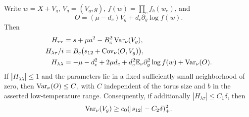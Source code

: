 \begin{lemma}\label{xyf:hessian}
Write \(w=X+V_q\), \(V_g=(V_q,g)\), \(f(w)=\prod_e f_b(w_e)\), and
\[
 O=(\mu-d_c)V_g+d_c\partial_g\log f(w).
\]
Then
\begin{align}
 H_{\tau\tau}&=s+\mu a^2-B_c^2\operatorname{Var}_\nu(V_g),
       \label{xyf:htt}\\
 H_{\lambda\tau}/i
     &=B_c\bigl(s_{12}+\operatorname{Cov}_\nu(O,V_g)\bigr),
       \label{xyf:hlt}\\
 H_{\lambda\lambda}
     &=-\mu-d_c^2+2\mu d_c
        +d_c^2\mathbb E_\nu\partial_g^2\log f(w)+\operatorname{Var}_\nu(O).
       \label{xyf:hll}
\end{align}
If \(|H_{\lambda\lambda}|\le1\) and the parameters lie in a fixed
sufficiently small neighborhood of zero, then \(\operatorname{Var}_\nu(O)\le C\),
with \(C\) independent of the torus size and \(b\) in the asserted
low-temperature range.  Consequently, if additionally
\(|H_{\lambda\tau}|\le C_1\delta\), then
\begin{equation}
 \operatorname{Var}_\nu(V_g)\ge c_0(|s_{12}|-C_2\delta)_+^2.
 \label{xyf:variance}
\end{equation}
\end{lemma}

